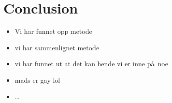\chapter{Conclusion}
\label{chapter:conclusion}

\begin{itemize}
  \item Vi har funnet opp metode
  \item vi har sammenlignet metode
  \item vi har funnet ut at det kan hende vi er inne p\aa~noe
  \item mads er gay lol
  \item \ldots
\end{itemize}